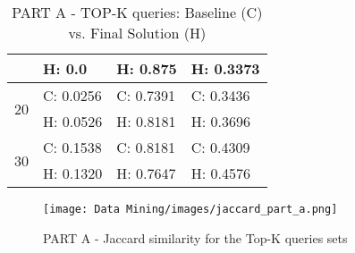 \begin{table}[]
\begin{tabular}{l|lll|}
\multicolumn{1}{|l|}{}                    & \multicolumn{1}{l|}{H: 0.0}    & \multicolumn{1}{l|}{H: 0.875}  & H: 0.3373 \\ \hline
\multicolumn{1}{|l|}{\multirow{2}{*}{20}} & \multicolumn{1}{l|}{C: 0.0256} & \multicolumn{1}{l|}{C: 0.7391} & C: 0.3436 \\ \cline{2-4} 
\multicolumn{1}{|l|}{}                    & \multicolumn{1}{l|}{H: 0.0526} & \multicolumn{1}{l|}{H: 0.8181} & H: 0.3696 \\ \hline
\multicolumn{1}{|l|}{\multirow{2}{*}{30}} & \multicolumn{1}{l|}{C: 0.1538} & \multicolumn{1}{l|}{C: 0.8181} & C: 0.4309 \\ \cline{2-4} 
\multicolumn{1}{|l|}{}                    & \multicolumn{1}{l|}{H: 0.1320} & \multicolumn{1}{l|}{H: 0.7647} & H: 0.4576 \\ \hline
\end{tabular}
\caption{PART A - TOP-K queries: Baseline (C) vs. Final Solution (H)}
\label{tab:jaccard}
\end{table}



\begin{figure}[h!]
\centering
\texttt{[image: Data Mining/images/jaccard\_part\_a.png]}
\caption{PART A - Jaccard similarity for the Top-K queries sets}
\label{fig:jaccard-topk-parta}
\end{figure}




